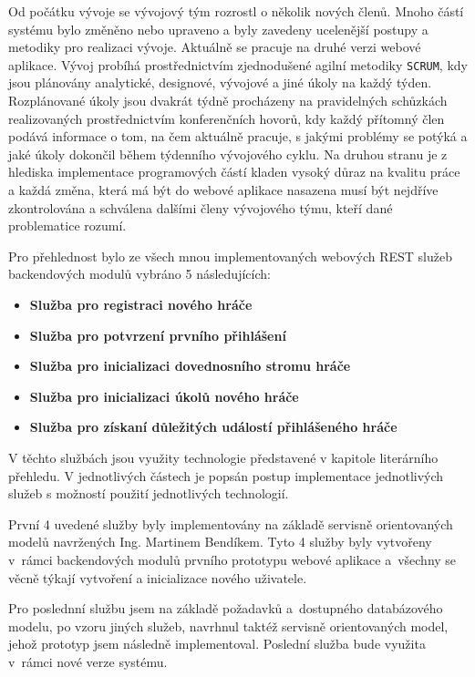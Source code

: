 \documentclass[twoside, 12pt]{article}
\begin{document}
{%
Od počátku vývoje se vývojový tým rozrostl o několik nových členů.
Mnoho částí systému bylo změněno nebo upraveno a byly zavedeny ucelenější postupy
a metodiky pro realizaci vývoje.
Aktuálně se pracuje na druhé verzi webové aplikace.
Vývoj probíhá prostřednictvím
zjednodušené agilní metodiky \texttt{SCRUM}, kdy jsou plánovány analytické, designové, vývojové a jiné
úkoly na každý týden. Rozplánované úkoly jsou dvakrát týdně procházeny na pravidelných schůzkách
realizovaných prostřednictvím konferenčních hovorů, kdy každý přítomný člen podává informace
o tom, na čem aktuálně pracuje, s jakými problémy se potýká a jaké úkoly dokončil během týdenního vývojového cyklu.
Na druhou stranu je z hlediska implementace programových částí kladen vysoký důraz na kvalitu práce
a každá změna, která má být do webové aplikace nasazena musí být nejdříve zkontrolována a schválena dalšími
členy vývojového týmu, kteří dané problematice rozumí.

Pro přehlednost bylo ze všech mnou implementovaných webových
REST služeb backendových modulů vybráno 5 následujících:

\begin{itemize}
\item \textbf{Služba pro registraci nového hráče}
\item \textbf{Služba pro potvrzení prvního přihlášení}
\item \textbf{Služba pro inicializaci dovednosního stromu hráče}
\item \textbf{Služba pro inicializaci úkolů nového hráče}
\item \textbf{Služba pro získaní důležitých událostí přihlášeného hráče}
\end{itemize}

V těchto službách jsou využity technologie představené v kapitole literárního přehledu.
V jednotlivých částech je popsán postup implementace jednotlivých služeb s možností použití jednotlivých technologií.

První 4 uvedené služby byly implementovány na základě servisně orientovaných modelů navržených Ing. Martinem Bendíkem.
Tyto 4 služby byly vytvořeny v~rámci backendových modulů prvního prototypu webové aplikace
a~všechny se věcně týkají vytvoření a inicializace nového uživatele.

Pro poslednní službu jsem na základě požadavků a~dostupného databázového modelu,
po vzoru jiných služeb, navrhnul taktéž servisně orientovaných model,
jehož prototyp jsem následně implementoval.
Poslední služba bude využita v~rámci nové verze systému.

}
\end{document}
